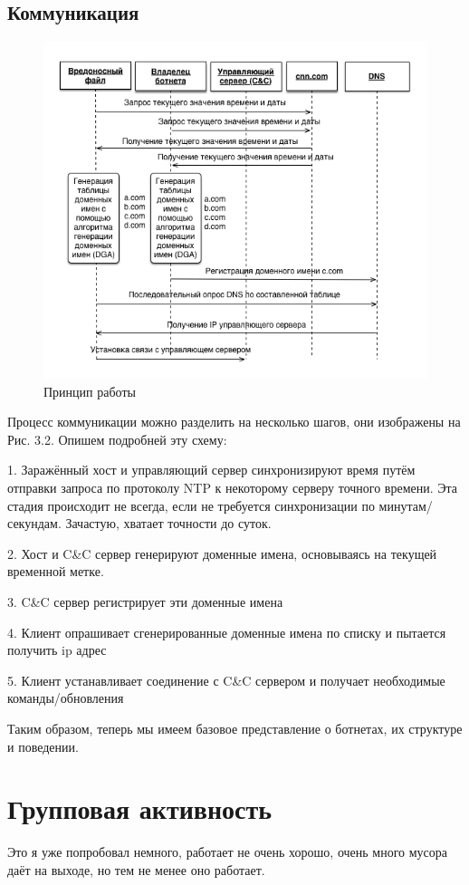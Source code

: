 \documentclass[14pt]{extreport}
\begin{document}
   \section{Коммуникация}
   \begin{figure}[H]
   	\centering
	\includegraphics[scale=0.8]{communicate.png}
	\caption{Принцип работы}
	\end{figure}
	Процесс коммуникации можно разделить на несколько шагов, они изображены на Рис. 3.2. Опишем подробней эту схему:
	
	1. Заражённый хост и управляющий сервер синхронизируют время путём отправки запроса по протоколу NTP к некоторому серверу точного времени. Эта стадия происходит не всегда, если не требуется синхронизации по минутам/секундам. Зачастую, хватает точности до суток.
	
	2. Хост и C\&C сервер генерируют доменные имена, основываясь на текущей временной метке.
	
	3. C\&C сервер регистрирует эти доменные имена
	
	4. Клиент опрашивает сгенерированные доменные имена по списку и пытается получить ip адрес
	
	5. Клиент устанавливает соединение с C\&C сервером и получает необходимые команды/обновления
	
Таким образом, теперь мы имеем базовое представление о ботнетах, их структуре и поведении.

	\chapter{Групповая активность}
	Это я уже попробовал немного, работает не очень хорошо, очень много мусора даёт на выходе, но тем не менее оно работает.
\end{document}
